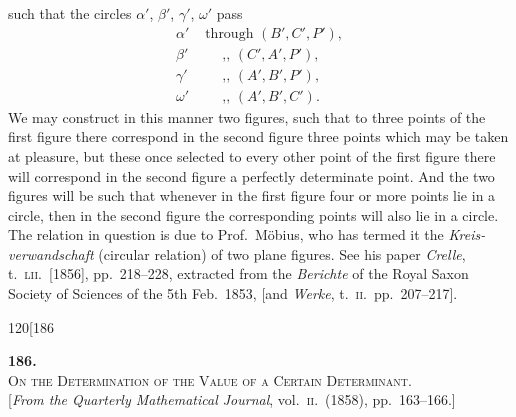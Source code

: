 \documentclass[11pt]{article}
\begin{document}
\noindent such that the circles $\alpha'$, $\beta'$, $\gamma'$, $\omega'$ pass
\begin{align*}
\alpha' &\text{ through } (B',C',P'),\\
\beta' &\quad\;\; \text{,, } (C',A',P'),\\
\gamma' &\quad\;\; \text{,, } (A',B',P'),\\
\omega' &\quad\;\; \text{,, } (A',B',C').
\end{align*}
We may construct in this manner two figures, such that to three points of the first
figure there correspond in the second figure three points which may be taken at
pleasure, but these once selected to every other point of the first figure there will
correspond in the second figure a perfectly determinate point. And the two figures
will be such that whenever in the first figure four or more points lie in a circle,
then in the second figure the corresponding points will also lie in a circle. The
relation in question is due to Prof.\ M\"obius, who has termed it the \textit{Kreis-verwandschaft}
(circular relation) of two plane figures. See his paper \textit{Crelle}, t.\ \textsc{lii}.\ [1856], pp.\ 218--228,
extracted from the \textit{Berichte} of the Royal Saxon Society of Sciences of the 5th Feb.\
1853, [and \textit{Werke}, t.\ \textsc{ii}.\ pp.\ 207--217].

\bigskip
\begin{center}\small\textsc{120}\hfill[186\end{center}

\begin{center}
\textbf{186.}\\[0.5em]
\textsc{On the Determination of the Value of a Certain Determinant.}\\[0.4em]
\small [\textit{From the Quarterly Mathematical Journal}, vol.\ \textsc{ii}.\ (1858), pp.\ 163--166.]
\end{center}
\end{document}
